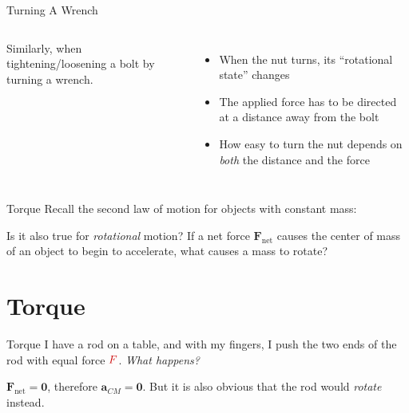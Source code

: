 \documentclass[12pt,compress,aspectratio=169]{beamer}
\begin{document}
\begin{frame}{Turning A Wrench}
  \begin{columns}
    
    Similarly, when tightening/loosening a bolt by turning a wrench.
    \begin{itemize}
    \item When the nut turns, its ``rotational state'' changes
    \item The applied force has to be directed at a distance away from the
      bolt
    \item How easy to turn the nut depends on \emph{both} the distance and the
      force
    \end{itemize}
  \end{columns}
\end{frame}



\begin{frame}{Torque}
  Recall the second law of motion for objects with constant mass:
    

  \vspace{-.1in}Is it also true for \emph{rotational} motion? If a net force
  $\bm{F}_\text{net}$ causes the center of mass of an object to begin to
  accelerate, what causes a mass to rotate?
\end{frame}


\section{Torque}

\begin{frame}{Torque}
  I have a rod on a table, and with my fingers, I push the two ends of the rod
  with equal force $\textcolor{red!80!black}{F}$. \emph{What happens?}
  \begin{center}
  \end{center}
  $\bm{F}_\text{net}=\bm{0}$, therefore $\bm{a}_{CM}=\bm{0}$. But it is also
  obvious that the rod would \emph{rotate} instead.
\end{frame}
\end{document}

